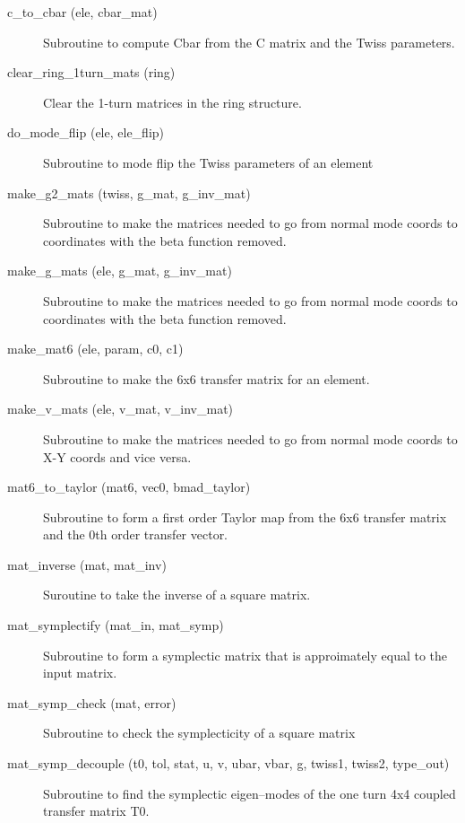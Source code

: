 \begin{description}

\item[c\_to\_cbar (ele, cbar\_mat)] \Newline
Subroutine to compute Cbar from the C matrix and the Twiss parameters. 

\item[clear\_ring\_1turn\_mats (ring)] \Newline
Clear the 1-turn matrices in the ring structure. 

\item[do\_mode\_flip (ele, ele\_flip)] \Newline
Subroutine to mode flip the Twiss parameters of an element 

\item[make\_g2\_mats (twiss, g\_mat, g\_inv\_mat)] \Newline
Subroutine to make the matrices needed to go from normal mode coords to 
coordinates with the beta function removed. 

\item[make\_g\_mats (ele, g\_mat, g\_inv\_mat)] \Newline
Subroutine to make the matrices needed to go from normal mode coords to 
coordinates with the beta function removed. 

\item[make\_mat6 (ele, param, c0, c1)] \Newline
Subroutine to make the 6x6 transfer matrix for an element. 

\item[make\_v\_mats (ele, v\_mat, v\_inv\_mat)] \Newline
Subroutine to make the matrices needed to go from normal mode coords to X-Y 
coords and vice versa. 

\item[mat6\_to\_taylor (mat6, vec0, bmad\_taylor)] \Newline
Subroutine to form a first order Taylor map from the 6x6 transfer matrix 
and the 0th order transfer vector. 

\item[mat\_inverse (mat, mat\_inv)] \Newline
Suroutine to take the inverse of a square matrix. 

\item[mat\_symplectify (mat\_in, mat\_symp)] \Newline
Subroutine to form a symplectic matrix that is approimately equal to the input matrix. 

\item[mat\_symp\_check (mat, error)] \Newline
Subroutine to check the symplecticity of a square matrix 

\item[mat\_symp\_decouple (t0, tol, stat, u, v, ubar, vbar, g, twiss1, twiss2, type\_out)] \Newline
Subroutine to find the symplectic eigen--modes of the one turn 4x4 coupled 
transfer matrix T0. 


\end{description}
